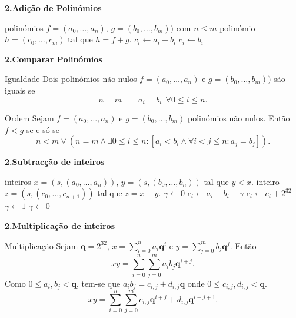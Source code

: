 \documentclass{beamer}
\newcommand{\q}{\mathbf{q}}
\begin{document}
\begin{frame}[fragile]{\bf 2.}{\bf Adição de Polinómios}
\begin{algorithmic}
\REQUIRE polinómios $f=(a_0,\ldots, a_n)$, $g=(b_0,\ldots, b_m))$ com $n\leq m$
\ENSURE polinómio $h=(c_0, \ldots, c_m)$ tal que $h=f+g$.
  \STATE $c_i \leftarrow a_i+b_i$
\ENDFOR
{}
  \STATE $c_i \leftarrow b_i$
\ENDFOR
\end{algorithmic}

\end{frame}


\begin{frame}[fragile]{\bf 2.}{\bf Comparar Polinómios}

\begin{block}{Igualdade}
 Dois polinómios não-nulos $f=(a_0,\ldots, a_n)$ e $g=(b_0,\ldots, b_m))$ são iguais se
$$n=m \qquad a_i=b_i \:\:\forall 0\leq i\leq n.$$
\end{block}
\pause
\begin{block}{Ordem} Sejam $f=(a_0,\ldots, a_n)$ e $g=(b_0,\ldots, b_m)$ polinómios não nulos. Então $f < g$ se e só se
$$n < m  \vee \left( n=m  \wedge \exists 0 \leq i \leq n: [ a_i<b_i \wedge \forall i<j\leq n: a_j=b_j] \right).$$
\end{block}
 
\end{frame}


\begin{frame}[fragile]{\bf 2.}{\bf Subtracção de inteiros}
\begin{algorithmic}
\REQUIRE inteiros $x=(s,(a_0,\ldots, a_n))$, $y=(s,(b_0,\ldots, b_n))$ tal que $y<x$.
\ENSURE inteiro $z=(s, (c_0, \ldots, c_{n+1}))$ tal que $z=x-y$.
\STATE $\gamma \leftarrow 0$ 
  \STATE $c_i \leftarrow a_i-b_i-\gamma$
        \STATE $c_i \leftarrow c_i + 2^{32}$
        \STATE $\gamma \leftarrow 1$
  \ELSE
	\STATE $\gamma \leftarrow 0$
  \ENDIF
\ENDFOR
\end{algorithmic}

\end{frame}




\begin{frame}{\bf 2.}{\bf Multiplicação de inteiros}
\begin{block}{Multiplicação} Sejam $\q=2^{32}$, $x=\sum_{i=0}^n a_i\q^i$ e $y=\sum_{j=0}^m b_j\q^j$. Então
$$ xy = \sum_{i=0}^n \sum_{j=0}^m a_ib_j \q^{i+j}.$$
Como $0\leq a_i, b_j < \q$, tem-se que $a_ib_j = c_{i,j} + d_{i,j}\q$ onde $0\leq c_{i,j}, d_{i,j} < \q$.
$$ xy = \sum_{i=0}^n \sum_{j=0}^m c_{i,j} \q^{i+j} + d_{i,j}\q^{i+j+1}.$$
\end{block}
\end{frame}
\end{document}
